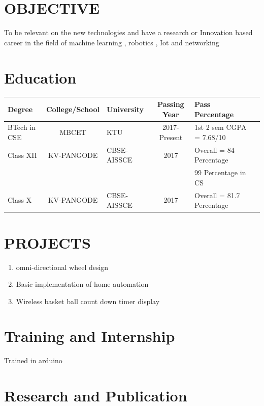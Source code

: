 \documentclass[margin,line]{res}
\begin{document}
\begin{resume}
\vspace{.1in}
\section{\sc OBJECTIVE}

To be relevant on the new technologies and have a research or Innovation based career in the field of machine learning , robotics , Iot and networking
\vspace{.1in}
\section{\sc Education}
\begin{tabular}{|l|c|l|c|l|c|}\hline
	\bf Degree&\bf College/School&\bf University&\bf Passing Year&\bf Pass Percentage \\ \hline
	BTech in CSE
	&MBCET & KTU & 2017-Present&1st 2 sem CGPA = 7.68/10 \\ \hline
	Class XII
	&KV-PANGODE & CBSE-AISSCE  & 2017& Overall = 84 Percentage \\&&&&99 Percentage in CS 
	
	\\ \hline
	Class X
	&KV-PANGODE & CBSE-AISSCE  & 2017& Overall = 81.7 Percentage 
	
	\\ \hline
\end{tabular}
\section{\sc PROJECTS}

\begin{enumerate} %
	\item omni-directional wheel design \\
	\item Basic implementation of home automation\\
	\item Wireless basket ball count down timer display\\
\end{enumerate}

\section{\sc Training and Internship}
Trained in arduino \\
\section{\sc Research and Publication}


\end{resume}
\end{document}
